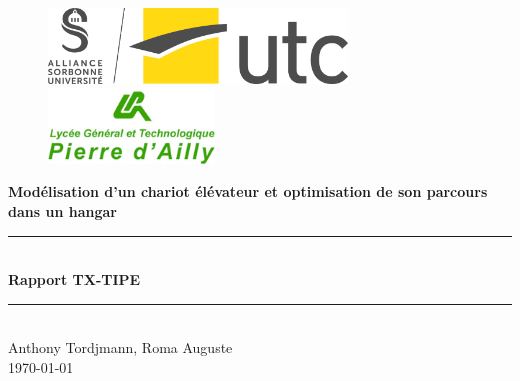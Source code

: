 \documentclass{report-UTC}
\begin{document}
\thispagestyle{empty}

\begin{figure}[h]
\centering
\includegraphics[height=2cm]{assets/logo_utc.jpg}
	\hspace{1cm}
\includegraphics[height=2cm]{assets/logo_dailly.png}
\end{figure}

\vspace{1.5cm}

\begin{center}
\huge{\textbf{Modélisation d'un chariot élévateur et optimisation de son parcours dans un hangar}} \\
\vspace{1cm}
\noindent\rule{10cm}{0.4pt} \\
\vspace{0.5cm}
\huge{\textbf{Rapport TX-TIPE}} \\
\vspace{0.5cm}
\noindent\rule{10cm}{0.4pt}  \\
\vspace{2cm}
\Large{Anthony Tordjmann, Roma Auguste} \\
\vspace{1.5cm}
\Large{\today}
\end{center}

\renewcommand*\contentsname{Sommaire}

\clearpage

\tableofcontents\thispagestyle{empty}

\clearpage

\clearpage

\clearpage

\clearpage

\clearpage

\clearpage
\printbibliography 
\end{document}

